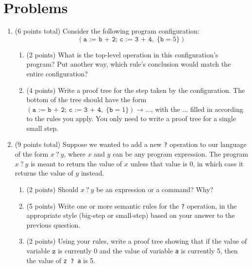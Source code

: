 \documentclass[11pt]{article}
\begin{document}
\section{Problems}

\begin{enumerate}
\item (6 points total) Consider the following program configuration: \[(\texttt{a := b + 2; c := 3 + 4},\; \{\texttt{b} = 5\})\]

\begin{enumerate}
\item (2 points) What is the top-level operation in this configuration's program? Put another way, which rule's conclusion would match the entire configuration?

\vspace{.5in}


\item (4 points) Write a proof tree for the step taken by the configuration. The bottom of the tree should have the form $(\texttt{a := b + 2; c := 3 + 4},\; \{\texttt{b} = 1\}) \rightarrow ...$, with the $...$ filled in according to the rules you apply. You only need to write a proof tree for a single small step.

\end{enumerate}
\newpage

\item (9 points total) Suppose we wanted to add a new \texttt{?} operation to our language of the form $x\ \texttt{?}\ y$, where $x$ and $y$ can be any program expression. The program $x\ \texttt{?}\ y$ is meant to return the value of $x$ unless that value is 0, in which case it returns the value of $y$ instead.

\begin{enumerate}
\item (2 points) Should $x\ \texttt{?}\ y$ be an expression or a command? Why?

\vspace{1in}

\item (5 points) Write one or more semantic rules for the \texttt{?} operation, in the appropriate style (big-step or small-step) based on your answer to the previous question.

\vspace{2.3in}

\item (2 points) Using your rules, write a proof tree showing that if the value of variable $\texttt{z}$ is currently 0 and the value of variable \texttt{a} is currently 5, then the value of \texttt{z ?\ a} is 5.


\end{enumerate}
\end{enumerate}
\end{document}

